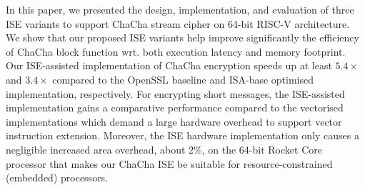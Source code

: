 In this paper, we presented the design, implementation, and evaluation of three ISE variants to support ChaCha stream cipher on 64-bit RISC-V architecture.
We show that our proposed ISE variants help improve significantly the efficiency of ChaCha block function wrt. both execution latency and memory footprint.  
Our ISE-assisted implementation of ChaCha encryption speeds up at least $5.4\times$ and $3.4\times$ compared to the OpenSSL baseline and ISA-base optimised implementation, respectively. 
For encrypting short messages, the ISE-assisted implementation gains a comparative performance compared to the vectorised implementations which demand a large hardware overhead to support vector instruction extension.
Moreover, the ISE hardware implementation only causes a negligible increased area overhead, about 2\%, on the 64-bit Rocket Core processor that makes our ChaCha ISE be suitable for resource-constrained (embedded) processors.




